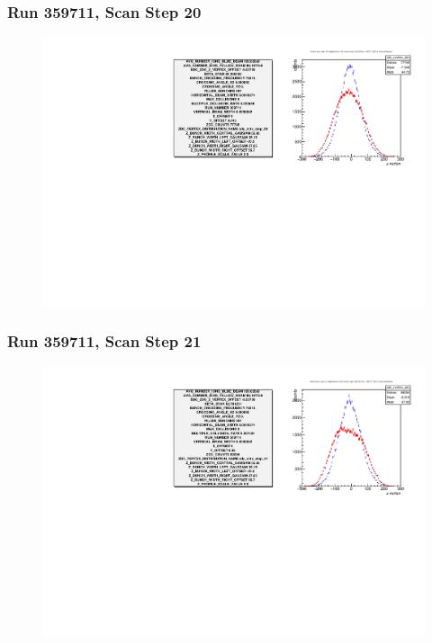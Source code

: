 \begin{frame}
\frametitle{Run 359711, Scan Step 20}
\begin{figure}
\begin{center}
\includegraphics[width=\linewidth]{"figures/359711_step_20_zdc_zvertex"}
\caption{ }
\label{fig:359711_step_20_zdc_zvertex}
\end{center}\end{figure}
\end{frame}

\begin{frame}
\frametitle{Run 359711, Scan Step 21}
\begin{figure}
\begin{center}
\includegraphics[width=\linewidth]{"figures/359711_step_21_zdc_zvertex"}
\caption{ }
\label{fig:359711_step_21_zdc_zvertex}
\end{center}\end{figure}
\end{frame}

